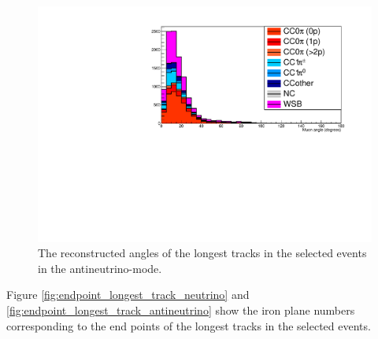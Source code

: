\begin{figure}[tbh]
\begin{center}
\includegraphics[width=0.5\linewidth, angle=270]{fig/RHCMuonAngle_StoppedOrThroughGoing.pdf}
\end{center}
\caption{
The reconstructed angles of the longest tracks in the selected events in the antineutrino-mode.
}
\label{fig:angle_allcut_antineutrino}
\end{figure}


%


Figure \ref{fig:endpoint_longest_track_neutrino} and \ref{fig:endpoint_longest_track_antineutrino} show the iron plane numbers corresponding to the end points of the longest tracks in the selected events.

